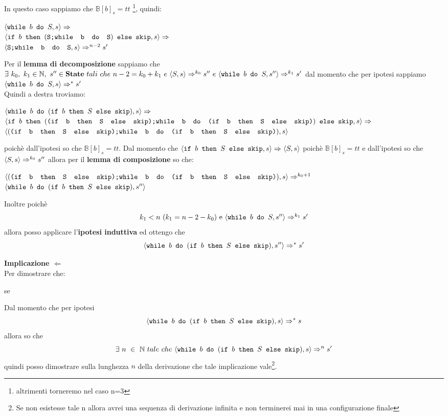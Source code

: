 {	 In questo caso sappiamo che $\mathbb{B}[b]_s=tt$
	\footnote{altrimenti torneremo nel caso n=3}, quindi:
	\begin{center}
	$\confSs{\wbS{b}{S}}{s}\Rar{}$\\
	$\confSs{
		\ifABC{b}
			{(\concat{S}{\wbS{b}{S}})}
			{\skipistr}
	}{s}\Rar{}$\\
	$\confSs{\concat{S}{\wbS{b}{S}}}{s}\Rar{n-2}s'$
	\end{center}
	Per il \textbf{lemma di decomposizione} sappiamo che 
	$\exists{}~k_0,~k_1\in\mathbb{N},~s''\in\states~tali~che~n-2=k_0+k_1~e~
	\confSs{S}{s}\Rar{k_0}s''~e~\confSs{\wbS{b}{S}}{s''}\Rar{k_1}s'$ dal
	momento che per ipotesi sappiamo $\confSs{\wbS{b}{S}}{s}\Rar{*}s'$\\
	Quindi a destra troviamo:
	\begin{center}
	$\confSs{\wbS{b}{(\ifABC{b}{S}{\skipistr})}}{s}\Rar{}$\\
	$\confSs{
		\ifABC{b}
		{(\concat{(\ifABC{b}{S}{\skipistr})}
		{\wbS{b}{(\ifABC{b}{S}{\skipistr})}})}
		{\skipistr}}{s}\Rar{}$\\
	$\confSs{
		{(\concat{(\ifABC{b}{S}{\skipistr})}
		{\wbS{b}{(\ifABC{b}{S}{\skipistr})}})}
	}{s}$
	\end{center}
	poichè dall'ipotesi so che $\mathbb{B}[b]_s=tt$. Dal momento che 
	$\confSs{\ifABC{b}{S}{\skipistr}}{s}\Rar{}\confSs{S}{s}$ poichè
	$\mathbb{B}[b]_s=tt$ e dall'ipotesi so che $\confSs{S}{s}\Rar{k_0}s''$
	allora per il \textbf{lemma di composizione} so che:
	\begin{center}
	$\confSs{
		{(\concat{(\ifABC{b}{S}{\skipistr})}
		{\wbS{b}{(\ifABC{b}{S}{\skipistr})}})}
	}{s}\Rar{k_0+1}$\\
	$\confSs{\wbS{b}{(\ifABC{b}{S}{\skipistr})}}{s''}$
	\end{center}
	Inoltre poichè \[ k_1<n~(k_1=n-2-k_0)$ e $\confSs{\wbS{b}{S}}{s''}\Rar{k_1}s' \]
	allora posso applicare l'\textbf{ipotesi induttiva} ed ottengo che
	\[ \confSs{\wbS{b}{(\ifABC{b}{S}{\skipistr})}}{s''}\Rar{*}s' \]

	\textbf{Implicazione $\Longleftarrow{}$} \\
	Per dimostrare che:
	\begin{center}
	se \exFourRtL{}
	\end{center}
	Dal momento che per ipotesi \[ \confSs{\wbS{b}
		{(\ifABC{b}{S}{\skipistr})}}{s}\Rar{*}s \] allora so che 
	\[ \exists{}~n~\in~\mathbb{N}~tale~che~\confSs{\wbS{b}
		{(\ifABC{b}{S}{\skipistr})}}{s}\Rar{n}s'  \]quindi
	posso dimostrare sulla lunghezza $n$ della derivazione che tale
	implicazione vale\footnote{Se non esistesse tale n allora avrei una sequenza di derivazione infinita e non terminerei mai in una configurazione finale}.\\
    
}
